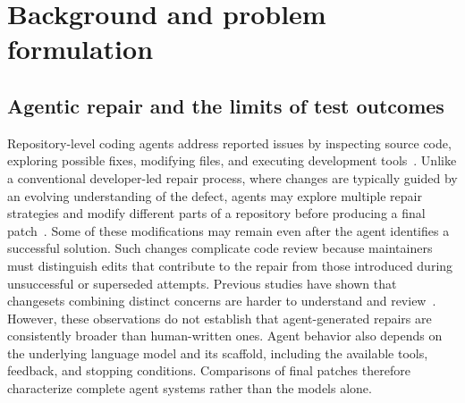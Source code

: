 \documentclass[a4paper,fleqn]{cas-sc}
\newcommand{\code}[1]{\texttt{\detokenize{#1}}}
\begin{document}





\section{Background and problem formulation}\label{sec:background}


\subsection{Agentic repair and the limits of test outcomes}
\label{sec:agents}

Repository-level coding agents address reported issues by inspecting source code, exploring possible fixes, modifying files, and executing development tools~\citep{yang2024sweagent,bouzenia2025trajectories}. Unlike a conventional developer-led repair process, where changes are typically guided by an evolving understanding of the defect, agents may explore multiple repair strategies and modify different parts of a repository before producing a final patch~\citep{mathai2026trim}. Some of these modifications may remain even after the agent identifies a successful solution. Such changes complicate code review because maintainers must distinguish edits that contribute to the repair from those introduced during unsuccessful or superseded attempts. Previous studies have shown that changesets combining distinct concerns are harder to understand and review~\citep{herzig2013tangled,barnett2015untangle}. However, these observations do not establish that agent-generated repairs are consistently broader than human-written ones. Agent behavior also depends on the underlying language model and its scaffold, including the available tools, feedback, and stopping conditions. Comparisons of final patches therefore characterize complete agent systems rather than the models alone.
\end{document}
